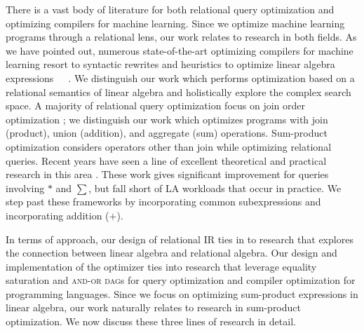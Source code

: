 There is a vast body of literature for both relational query optimization and
optimizing compilers for machine learning. Since we optimize machine learning programs through a
relational lens, our work relates to research in both fields. As we have pointed
out, numerous state-of-the-art optimizing compilers for machine learning
 resort to syntactic rewrites and heuristics to optimize linear algebra
expressions~\cite{DBLP:reference/bdt/Boehm19}~\cite{DBLP:conf/icml/SujeethLBRCWAOO11}~\cite{DBLP:conf/sigmod/HuangB013}. We distinguish our work which performs optimization based on a
relational semantics of linear algebra and holistically explore the complex
search space. A majority of relational query optimization focus on join order
optimization \cite{Graefe95a} \cite{MoerkotteN06} \cite{MoerkotteN08}
\cite{selinger1979access}; we distinguish our work which optimizes programs with
join (product), union (addition), and aggregate (sum) operations. Sum-product optimization considers operators other than join while optimizing
relational queries. Recent years have seen a line of excellent theoretical and
practical research in this area \cite{KhamisNR16} \cite{Joglekar2016AJARAA}.
These work gives significant improvement for queries involving $*$ and $\sum$,
but fall short of LA workloads that occur in practice. We step past these
frameworks by incorporating common subexpressions and incorporating addition
($+$). 

In terms of approach, our design of relational IR ties in to research that
explores the connection between linear algebra and relational algebra. Our
design and implementation of the optimizer ties into research that leverage
equality saturation and \textsc{and-or dag}s for query optimization and compiler
optimization for programming languages. Since we focus on optimizing sum-product
expressions in linear algebra, our work naturally relates to research in sum-product
optimization. We now discuss these three lines of research in detail. 

